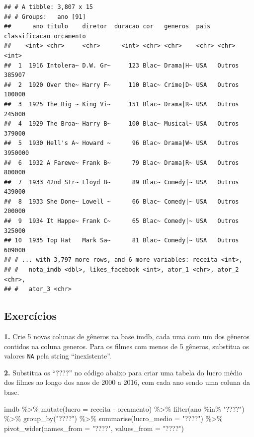 \documentclass[
]{book}
\newenvironment{Shaded}{\begin{snugshade}}{\end{snugshade}}
\newcommand{\AttributeTok}[1]{\textcolor[rgb]{0.77,0.63,0.00}{#1}}
\newcommand{\FunctionTok}[1]{\textcolor[rgb]{0.00,0.00,0.00}{#1}}
\newcommand{\NormalTok}[1]{#1}
\newcommand{\SpecialCharTok}[1]{\textcolor[rgb]{0.00,0.00,0.00}{#1}}
\newcommand{\StringTok}[1]{\textcolor[rgb]{0.31,0.60,0.02}{#1}}
\begin{document}
\begin{verbatim}
## # A tibble: 3,807 x 15
## # Groups:   ano [91]
##      ano titulo    diretor  duracao cor   generos  pais  classificacao orcamento
##    <int> <chr>     <chr>      <int> <chr> <chr>    <chr> <chr>             <int>
##  1  1916 Intolera~ D.W. Gr~     123 Blac~ Drama|H~ USA   Outros           385907
##  2  1920 Over the~ Harry F~     110 Blac~ Crime|D~ USA   Outros           100000
##  3  1925 The Big ~ King Vi~     151 Blac~ Drama|R~ USA   Outros           245000
##  4  1929 The Broa~ Harry B~     100 Blac~ Musical~ USA   Outros           379000
##  5  1930 Hell's A~ Howard ~      96 Blac~ Drama|W~ USA   Outros          3950000
##  6  1932 A Farewe~ Frank B~      79 Blac~ Drama|R~ USA   Outros           800000
##  7  1933 42nd Str~ Lloyd B~      89 Blac~ Comedy|~ USA   Outros           439000
##  8  1933 She Done~ Lowell ~      66 Blac~ Comedy|~ USA   Outros           200000
##  9  1934 It Happe~ Frank C~      65 Blac~ Comedy|~ USA   Outros           325000
## 10  1935 Top Hat   Mark Sa~      81 Blac~ Comedy|~ USA   Outros           609000
## # ... with 3,797 more rows, and 6 more variables: receita <int>,
## #   nota_imdb <dbl>, likes_facebook <int>, ator_1 <chr>, ator_2 <chr>,
## #   ator_3 <chr>
\end{verbatim}

\hypertarget{exercuxedcios-18}{%
\subsection{Exercícios}\label{exercuxedcios-18}}

\textbf{1.} Crie 5 novas colunas de gêneros na base imdb, cada uma com um dos gêneros contidos na coluna generos. Para os filmes com menos de 5 gêneros, substitua os valores \texttt{NA} pela string ``inexistente''.

\textbf{2.} Substitua os ``????'' no código abaixo para criar uma tabela do lucro médio dos filmes ao longo dos anos de 2000 a 2016, com cada ano sendo uma coluna da base.

\begin{Shaded}
\begin{Highlighting}[]
\NormalTok{imdb }\SpecialCharTok{\%\textgreater{}\%}
  \FunctionTok{mutate}\NormalTok{(}\AttributeTok{lucro =}\NormalTok{ receita }\SpecialCharTok{{-}}\NormalTok{ orcamento) }\SpecialCharTok{\%\textgreater{}\%}
  \FunctionTok{filter}\NormalTok{(ano }\SpecialCharTok{\%in\%} \StringTok{"????"}\NormalTok{) }\SpecialCharTok{\%\textgreater{}\%}
  \FunctionTok{group\_by}\NormalTok{(}\StringTok{"????"}\NormalTok{) }\SpecialCharTok{\%\textgreater{}\%}
  \FunctionTok{summarise}\NormalTok{(}\AttributeTok{lucro\_medio =} \StringTok{"????"}\NormalTok{) }\SpecialCharTok{\%\textgreater{}\%}
  \FunctionTok{pivot\_wider}\NormalTok{(}\AttributeTok{names\_from =} \StringTok{"????"}\NormalTok{, }\AttributeTok{values\_from =} \StringTok{"????"}\NormalTok{)}
\end{Highlighting}
\end{Shaded}
\end{document}
